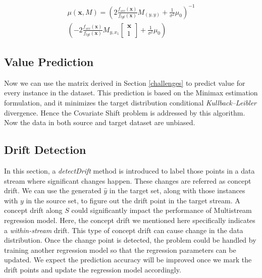 \documentclass[conference,compsoc]{IEEEtran}
\begin{document}
\begin{equation} \label{eq1}
\begin{split}
\mu \left( \textbf{x}, M \right) = \left( 2\frac { f_{ src }\left( \textbf{x} \right)  }{ f_{ tgt }\left( \textbf{x} \right)  } M_{ (y,y) }+\frac { 1 }{ { \sigma  }^{ 2 } } { \mu  }_{ 0 } \right)^{-1} \\ 
  \left( -2\frac { f_{ src }\left( \textbf{x} \right)  }{ f_{ tgt }\left( \textbf{x} \right)  } M_{ y,x_{1} }\left[ \begin{matrix} \textbf{x} \\ 1 \end{matrix} \right] +\frac { 1 }{ { \sigma  }^{ 2 } } { \mu  }_{ 0 } \right)
\end{split}
\end{equation}

\subsection{Value Prediction}
Now we can use the matrix derived in Section \ref{challenges} to
predict value for every instance in the dataset. This
prediction is based on the Minimax estimation formulation, and
it minimizes the target distribution conditional
\emph{Kullback–Leibler} divergence. Hence the Covariate Shift problem
is addressed by this algorithm. Now the data in both source and target dataset are unbiased.


\subsection{Drift Detection}

In this section, a \emph{detectDrift} method is introduced to label those 
points in a data stream where significant changes happen. These changes are referred as concept drift.
We can use the generated $\hat{y}$ in the target set, along
with those instances with $y$ in the source set, to figure out 
the drift point in the target stream. 
A concept drift along $S$ could significantly impact the performance of
Multistream regression model. Here, the concept drift we mentioned
here specifically indicates a \emph{within-stream} drift. This type
of concept drift can cause change in the data distribution. Once
the change point is detected, the problem could be handled by
training another regression model so that the regression
parameters can be updated. We expect the prediction accuracy will be improved once we mark the drift points and update the regression model accordingly.
\end{document}
